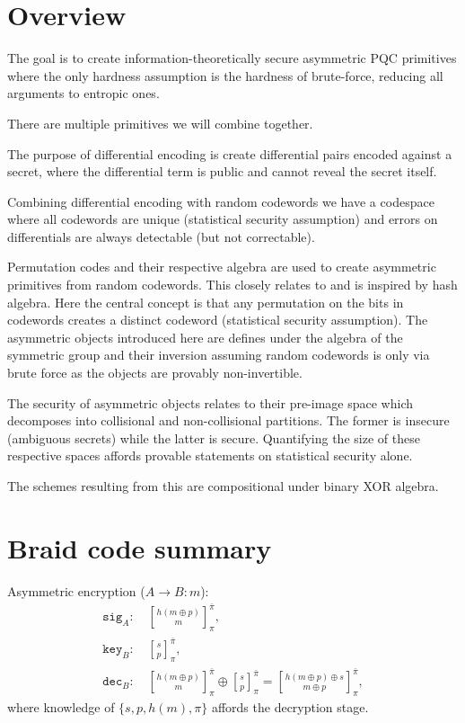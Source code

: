 \documentclass[twocolumn, aps, amsmath, amssymb, nofootinbib, superscriptaddress, longbibliography, doublefloatfix, table-of-contents, eqsecnum, rmp]{revtex4-2}
\newcommand{\stackbraid}[2]{{\genfrac{[}{]}{0pt}{}{{#1}}{{#2}}}^{\bar{\pi}}_{\pi}}
\begin{document}
\section{Overview}

The goal is to create information-theoretically secure asymmetric PQC primitives where the only hardness assumption is the hardness of brute-force, reducing all arguments to entropic ones.

There are multiple primitives we will combine together.

The purpose of differential encoding is create differential pairs encoded against a secret, where the differential term is public and cannot reveal the secret itself.

Combining differential encoding with random codewords we have a codespace where all codewords are unique (statistical security assumption) and errors on differentials are always detectable (but not correctable).

Permutation codes and their respective algebra are used to create asymmetric primitives from random codewords. This closely relates to and is inspired by hash algebra. Here the central concept is that any permutation on the bits in codewords creates a distinct codeword (statistical security assumption). The asymmetric objects introduced here are defines under the algebra of the symmetric group and their inversion assuming random codewords is only via brute force as the objects are provably non-invertible.

The security of asymmetric objects relates to their pre-image space which decomposes into collisional and non-collisional partitions. The former is insecure (ambiguous secrets) while the latter is secure. Quantifying the size of these respective spaces affords provable statements on statistical security alone.

The schemes resulting from this are compositional under binary XOR algebra.

\section{Braid code summary}

Asymmetric encryption ($A\to B: m$):
\begin{align}
	\mathtt{sig}_A:\, &\stackbraid{h(m\oplus p)}{m},\nonumber\\
	\mathtt{key}_B:\, &\stackbraid{s}{p},\nonumber\\
	\mathtt{dec}_B:\, &\stackbraid{h(m\oplus p)}{m}\oplus \stackbraid{s}{p} = \stackbraid{h(m\oplus p)\oplus s}{m\oplus p},
\end{align}
where knowledge of $\{s,p,h(m),\pi\}$ affords the decryption stage.
\end{document}
